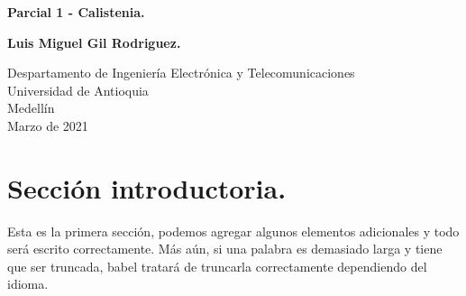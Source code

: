 \documentclass{article}
\begin{document}
\begin{titlepage}
    \begin{center}
        \vspace*{1cm}
            
        \Huge
        \textbf{Parcial 1 - Calistenia.}
            
        \vspace{0.5cm}
        \LARGE
            
        \vspace{1.5cm}
            
        \textbf{Luis Miguel Gil Rodriguez.}
            
        \vfill
            
        \vspace{0.8cm}
            
        \Large
        Despartamento de Ingeniería Electrónica y Telecomunicaciones\\
        Universidad de Antioquia\\
        Medellín\\
        Marzo de 2021
            
    \end{center}
\end{titlepage}

\tableofcontents
\newpage
\section{Sección introductoria.}\label{intro}
Esta es la primera sección, podemos agregar algunos elementos adicionales y todo será escrito correctamente. Más aún, si una palabra es demasiado larga y tiene que ser truncada, babel tratará de truncarla correctamente dependiendo del idioma.
\end{document}
